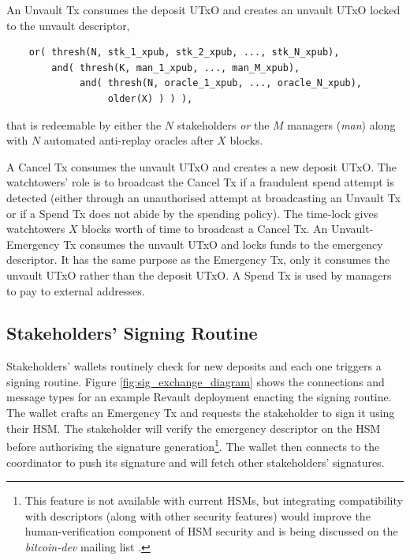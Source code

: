 \documentclass[runningheads]{llncs}
\begin{document}
An Unvault Tx consumes the deposit UTxO and creates an unvault UTxO locked to the unvault descriptor, \begin{verbatim}
    or( thresh(N, stk_1_xpub, stk_2_xpub, ..., stk_N_xpub), 
        and( thresh(K, man_1_xpub, ..., man_M_xpub), 
             and( thresh(N, oracle_1_xpub, ..., oracle_N_xpub),
                  older(X) ) ) ),
\end{verbatim}
that is redeemable by either the $N$ stakeholders \textit{or} the $M$ managers (\textit{man}) along with $N$ automated anti-replay oracles after $X$ blocks.

A Cancel Tx consumes the unvault UTxO and creates a new deposit UTxO. The watchtowers' role is to broadcast the Cancel Tx if a fraudulent spend attempt is detected (either through an unauthorised attempt at broadcasting an Unvault Tx or if a Spend Tx does not abide by the spending policy).  The time-lock gives watchtowers $X$ blocks worth of time to broadcast a Cancel Tx. 
An Unvault-Emergency Tx consumes the unvault UTxO and locks funds to the emergency descriptor. It has the same purpose as the Emergency Tx, only it consumes the unvault UTxO rather than the deposit UTxO.
A Spend Tx is used by managers to pay to external addresses.

\subsection{Stakeholders' Signing Routine}

Stakeholders' wallets routinely check for new deposits 
and each one triggers a signing routine. Figure \ref{fig:sig_exchange_diagram} shows the connections and message types for an example Revault deployment enacting the signing routine. The wallet crafts an Emergency Tx and requests the stakeholder to sign it using their HSM. The stakeholder will verify the emergency descriptor on the HSM before authorising the signature generation\footnote{This feature is not available with current HSMs, but integrating compatibility with descriptors (along with other security features) would improve the human-verification component of HSM security and is being discussed on the \textit{bitcoin-dev} mailing list \cite{AdvancedHMfeatures}.}. %
The wallet then connects to the coordinator to push its signature and will fetch other stakeholders' signatures.
\end{document}

